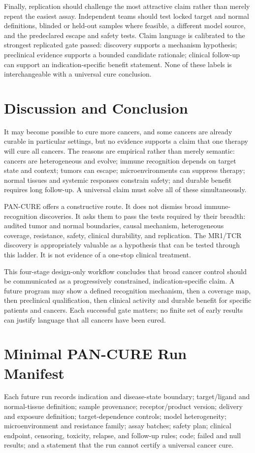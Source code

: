 \documentclass[10pt,conference]{IEEEtran}
\begin{document}
Finally, replication should challenge the most attractive claim rather than merely repeat the easiest assay. Independent teams should test locked target and normal definitions, blinded or held-out samples where feasible, a different model source, and the predeclared escape and safety tests. Claim language is calibrated to the strongest replicated gate passed: discovery supports a mechanism hypothesis; preclinical evidence supports a bounded candidate rationale; clinical follow-up can support an indication-specific benefit statement. None of these labels is interchangeable with a universal cure conclusion.

\section{Discussion and Conclusion}\label{sec:discussion}
It may become possible to cure more cancers, and some cancers are already curable in particular settings, but no evidence supports a claim that one therapy will cure all cancers. The reasons are empirical rather than merely semantic: cancers are heterogeneous and evolve; immune recognition depends on target state and context; tumors can escape; microenvironments can suppress therapy; normal tissues and systemic responses constrain safety; and durable benefit requires long follow-up. A universal claim must solve all of these simultaneously.

PAN-CURE offers a constructive route. It does not dismiss broad immune-recognition discoveries. It asks them to pass the tests required by their breadth: audited tumor and normal boundaries, causal mechanism, heterogeneous coverage, resistance, safety, clinical durability, and replication. The MR1/TCR discovery is appropriately valuable as a hypothesis that can be tested through this ladder. It is not evidence of a one-stop clinical treatment.

This four-stage design-only workflow concludes that broad cancer control should be communicated as a progressively constrained, indication-specific claim. A future program may show a defined recognition mechanism, then a coverage map, then preclinical qualification, then clinical activity and durable benefit for specific patients and cancers. Each successful gate matters; no finite set of early results can justify language that all cancers have been cured.

\appendices
\section{Minimal PAN-CURE Run Manifest}
Each future run records indication and disease-state boundary; target/ligand and normal-tissue definition; sample provenance; receptor/product version; delivery and exposure definition; target-dependence controls; model heterogeneity; microenvironment and resistance family; assay batches; safety plan; clinical endpoint, censoring, toxicity, relapse, and follow-up rules; code; failed and null results; and a statement that the run cannot certify a universal cancer cure.
\end{document}
